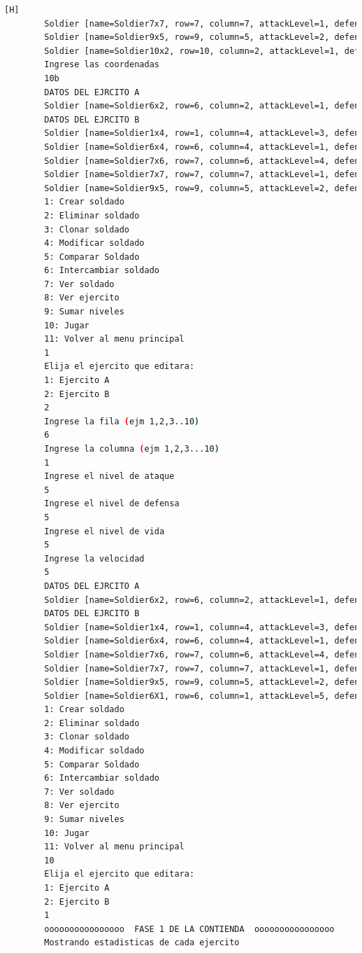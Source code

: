 \documentclass{article}
\begin{document}
\begin{lstlisting}[language=bash,caption={Compilando y probando el programa completo  }][H]
		Soldier [name=Soldier7x7, row=7, column=7, attackLevel=1, defenseLevel=4, actualLife=4, speed=0, attitude=Repose, current=true]
		Soldier [name=Soldier9x5, row=9, column=5, attackLevel=2, defenseLevel=5, actualLife=1, speed=0, attitude=Repose, current=true]
		Soldier [name=Soldier10x2, row=10, column=2, attackLevel=1, defenseLevel=3, actualLife=2, speed=0, attitude=Repose, current=true]
		Ingrese las coordenadas
		10b
		DATOS DEL EJRCITO A
		Soldier [name=Soldier6x2, row=6, column=2, attackLevel=1, defenseLevel=5, actualLife=1, speed=0, attitude=Repose, current=true]
		DATOS DEL EJRCITO B
		Soldier [name=Soldier1x4, row=1, column=4, attackLevel=3, defenseLevel=3, actualLife=4, speed=0, attitude=Repose, current=true]
		Soldier [name=Soldier6x4, row=6, column=4, attackLevel=1, defenseLevel=4, actualLife=2, speed=0, attitude=Repose, current=true]
		Soldier [name=Soldier7x6, row=7, column=6, attackLevel=4, defenseLevel=2, actualLife=1, speed=0, attitude=Repose, current=true]
		Soldier [name=Soldier7x7, row=7, column=7, attackLevel=1, defenseLevel=4, actualLife=4, speed=0, attitude=Repose, current=true]
		Soldier [name=Soldier9x5, row=9, column=5, attackLevel=2, defenseLevel=5, actualLife=1, speed=0, attitude=Repose, current=true]
		1: Crear soldado
		2: Eliminar soldado
		3: Clonar soldado
		4: Modificar soldado
		5: Comparar Soldado
		6: Intercambiar soldado
		7: Ver soldado
		8: Ver ejercito
		9: Sumar niveles
		10: Jugar
		11: Volver al menu principal
		1
		Elija el ejercito que editara:
		1: Ejercito A
		2: Ejercito B
		2
		Ingrese la fila (ejm 1,2,3..10)
		6
		Ingrese la columna (ejm 1,2,3...10)
		1
		Ingrese el nivel de ataque
		5
		Ingrese el nivel de defensa
		5
		Ingrese el nivel de vida
		5
		Ingrese la velocidad
		5
		DATOS DEL EJRCITO A
		Soldier [name=Soldier6x2, row=6, column=2, attackLevel=1, defenseLevel=5, actualLife=1, speed=0, attitude=Repose, current=true]
		DATOS DEL EJRCITO B
		Soldier [name=Soldier1x4, row=1, column=4, attackLevel=3, defenseLevel=3, actualLife=4, speed=0, attitude=Repose, current=true]
		Soldier [name=Soldier6x4, row=6, column=4, attackLevel=1, defenseLevel=4, actualLife=2, speed=0, attitude=Repose, current=true]
		Soldier [name=Soldier7x6, row=7, column=6, attackLevel=4, defenseLevel=2, actualLife=1, speed=0, attitude=Repose, current=true]
		Soldier [name=Soldier7x7, row=7, column=7, attackLevel=1, defenseLevel=4, actualLife=4, speed=0, attitude=Repose, current=true]
		Soldier [name=Soldier9x5, row=9, column=5, attackLevel=2, defenseLevel=5, actualLife=1, speed=0, attitude=Repose, current=true]
		Soldier [name=Soldier6X1, row=6, column=1, attackLevel=5, defenseLevel=5, actualLife=5, speed=0, attitude=Repose, current=true]
		1: Crear soldado
		2: Eliminar soldado
		3: Clonar soldado
		4: Modificar soldado
		5: Comparar Soldado
		6: Intercambiar soldado
		7: Ver soldado
		8: Ver ejercito
		9: Sumar niveles
		10: Jugar
		11: Volver al menu principal
		10
		Elija el ejercito que editara:
		1: Ejercito A
		2: Ejercito B
		1
		oooooooooooooooo  FASE 1 DE LA CONTIENDA  oooooooooooooooo
		Mostrando estadisticas de cada ejercito
		

\end{lstlisting}
\end{document}
